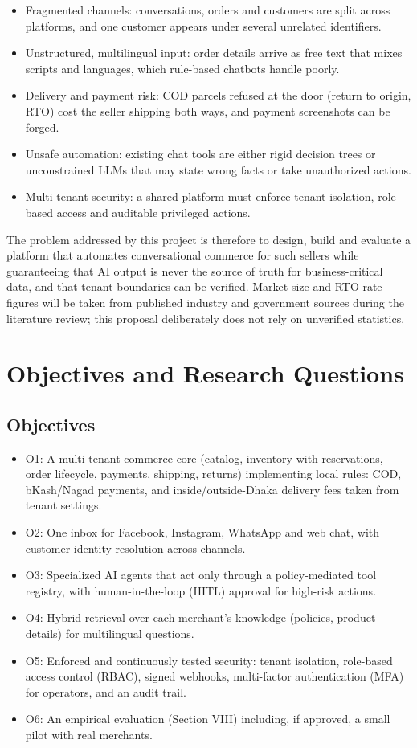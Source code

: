\documentclass[conference,a4paper]{IEEEtran}
\begin{document}
\begin{itemize}
\item Fragmented channels: conversations, orders and customers are split across platforms, and one customer appears under several unrelated identifiers.
\item Unstructured, multilingual input: order details arrive as free text that mixes scripts and languages, which rule-based chatbots handle poorly.
\item Delivery and payment risk: COD parcels refused at the door (return to origin, RTO) cost the seller shipping both ways, and payment screenshots can be forged.
\item Unsafe automation: existing chat tools are either rigid decision trees or unconstrained LLMs that may state wrong facts or take unauthorized actions.
\item Multi-tenant security: a shared platform must enforce tenant isolation, role-based access and auditable privileged actions.
\end{itemize}

The problem addressed by this project is therefore to design, build and evaluate a platform that automates conversational commerce for such sellers while guaranteeing that AI output is never the source of truth for business-critical data, and that tenant boundaries can be verified. Market-size and RTO-rate figures will be taken from published industry and government sources during the literature review; this proposal deliberately does not rely on unverified statistics.


\section{Objectives and Research Questions}
\subsection{Objectives}
\begin{itemize}
\item O1: A multi-tenant commerce core (catalog, inventory with reservations, order lifecycle, payments, shipping, returns) implementing local rules: COD, bKash/Nagad payments, and inside/outside-Dhaka delivery fees taken from tenant settings.
\item O2: One inbox for Facebook, Instagram, WhatsApp and web chat, with customer identity resolution across channels.
\item O3: Specialized AI agents that act only through a policy-mediated tool registry, with human-in-the-loop (HITL) approval for high-risk actions.
\item O4: Hybrid retrieval over each merchant's knowledge (policies, product details) for multilingual questions.
\item O5: Enforced and continuously tested security: tenant isolation, role-based access control (RBAC), signed webhooks, multi-factor authentication (MFA) for operators, and an audit trail.
\item O6: An empirical evaluation (Section VIII) including, if approved, a small pilot with real merchants.
\end{itemize}
\end{document}
